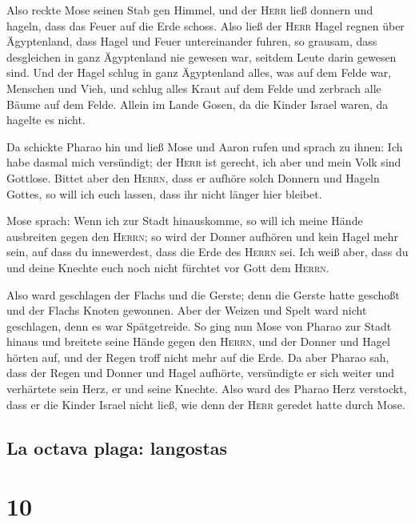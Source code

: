  Also reckte Mose seinen Stab gen Himmel, und der
\textsc{Herr} ließ donnern und hageln, dass das Feuer auf die Erde
schoss. Also ließ der \textsc{Herr} Hagel regnen über Ägyptenland,
 dass Hagel und Feuer untereinander fuhren, so grausam,
dass desgleichen in ganz Ägyptenland nie gewesen war, seitdem Leute
darin gewesen sind.  Und der Hagel schlug in ganz
Ägyptenland alles, was auf dem Felde war, Menschen und Vieh, und schlug
alles Kraut auf dem Felde und zerbrach alle Bäume auf dem Felde.
 Allein im Lande Gosen, da die Kinder Israel waren, da
hagelte es nicht.

 Da schickte Pharao hin und ließ Mose und Aaron rufen und
sprach zu ihnen: Ich habe dasmal mich versündigt; der \textsc{Herr} ist
gerecht, ich aber und mein Volk sind Gottlose.  Bittet
aber den \textsc{Herrn}, dass er aufhöre solch Donnern und Hageln
Gottes, so will ich euch lassen, dass ihr nicht länger hier bleibet.

 Mose sprach: Wenn ich zur Stadt hinauskomme, so will ich
meine Hände ausbreiten gegen den \textsc{Herrn}; so wird der Donner
aufhören und kein Hagel mehr sein, auf dass du innewerdest, dass die
Erde des \textsc{Herrn} sei.  Ich weiß aber, dass du und
deine Knechte euch noch nicht fürchtet vor Gott dem \textsc{Herrn}.

 Also ward geschlagen der Flachs und die Gerste; denn die
Gerste hatte geschoßt und der Flachs Knoten gewonnen. 
Aber der Weizen und Spelt ward nicht geschlagen, denn es war
Spätgetreide.  So ging nun Mose von Pharao zur Stadt
hinaus und breitete seine Hände gegen den \textsc{Herrn}, und der Donner
und Hagel hörten auf, und der Regen troff nicht mehr auf die Erde.
 Da aber Pharao sah, dass der Regen und Donner und Hagel
aufhörte, versündigte er sich weiter und verhärtete sein Herz, er und
seine Knechte.  Also ward des Pharao Herz verstockt, dass
er die Kinder Israel nicht ließ, wie denn der \textsc{Herr} geredet
hatte durch Mose.

\hypertarget{la-octava-plaga-langostas}{%
\subsection{La octava plaga:
langostas}\label{la-octava-plaga-langostas}}

\hypertarget{section-9}{%
\section{10}\label{section-9}}

